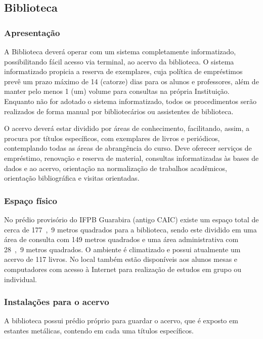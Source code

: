 \subsection{Biblioteca}

\subsubsection{Apresenta\c{c}\~ao}

A Biblioteca deverá operar com um sistema completamente informatizado, possibilitando fácil acesso via terminal, ao acervo da biblioteca. O sistema informatizado propicia a reserva de exemplares, cuja política de empréstimos prevê um prazo máximo de 14 (catorze) dias para os alunos e professores, além de manter pelo menos 1 (um) volume para consultas na própria Instituição. Enquanto não for adotado o sistema informatizado, todos os procedimentos serão realizados de forma manual por bibliotecários ou assistentes de biblioteca.

O acervo deverá estar dividido por áreas de conhecimento, facilitando, assim, a procura por títulos específicos, com exemplares de livros e periódicos, contemplando todas as áreas de abrangência do curso. Deve oferecer serviços de empréstimo, renovação e reserva de material, consultas informatizadas às bases de dados e ao acervo, orientação na normalização de trabalhos acadêmicos, orientação bibliográfica e visitas orientadas.

\subsubsection{Espa\c{c}o f\'isico}

No pr\'edio provis\'orio do IFPB Guarabira (antigo CAIC) existe um espaço total de cerca de \unit{177,9} metros quadrados para a biblioteca, sendo este dividido em uma área de consulta com \unit{149} metros quadrados e uma área administrativa com \unit{28,9} metros quadrados. O ambiente \'e climatizado e possui atualmente um acervo de 117 livros. No local também estão disponíveis aos alunos mesas e computadores com acesso \`a Internet para realiza\c{c}\~ao de estudos em grupo ou individual.

\subsubsection{Instala\c{c}\~oes para o acervo}


A biblioteca possui prédio próprio para guardar o acervo, que é exposto em estantes metálicas, contendo em cada uma títulos específicos. 

